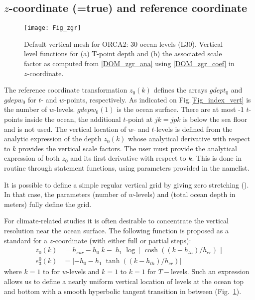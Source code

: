 \documentclass[NEMO_book]{subfiles}
\begin{document}
{%
\subsection[$z$-coordinate (\np{ln\_zco}]
	  	  {$z$-coordinate (=true) and reference coordinate}
\label{DOM_zco}

\begin{figure}[!tb]    \begin{center}
\texttt{[image: Fig\_zgr]}
\caption{ \label{Fig_zgr}    
Default vertical mesh for ORCA2: 30 ocean levels (L30). Vertical level functions for 
(a) T-point depth and (b) the associated scale factor as computed 
from \eqref{DOM_zgr_ana} using \eqref{DOM_zgr_coef} in $z$-coordinate.}
\end{center}   \end{figure}

The reference coordinate transformation $z_0 (k)$ defines the arrays $gdept_0$ 
and $gdepw_0$ for $t$- and $w$-points, respectively. As indicated on 
Fig.\ref{Fig_index_vert}  is the number of $w$-levels. $gdepw_0(1)$ is the 
ocean surface. There are at most -1 $t$-points inside the ocean, the 
additional $t$-point at $jk=jpk$ is below the sea floor and is not used. 
The vertical location of $w$- and $t$-levels is defined from the analytic expression 
of the depth $z_0(k)$ whose analytical derivative with respect to $k$ provides the 
vertical scale factors. The user must provide the analytical expression of both 
$z_0$ and its first derivative with respect to $k$. This is done in routine  
through statement functions, using parameters provided in the  namelist. 

It is possible to define a simple regular vertical grid by giving zero stretching (). 
In that case, the parameters  (number of $w$-levels) and  
(total ocean depth in meters) fully define the grid. 

For climate-related studies it is often desirable to concentrate the vertical resolution 
near the ocean surface. The following function is proposed as a standard for a 
$z$-coordinate (with either full or partial steps): 
\begin{equation} \label{DOM_zgr_ana}
\begin{split}
 z_0 (k) 	&= h_{sur} -h_0 \;k-\;h_1 \;\log \left[ {\,\cosh \left( {{(k-h_{th} )} / {h_{cr} }} \right)\,} \right] \\ 
 e_3^0 (k) 	&= \left| -h_0 -h_1 \;\tanh \left( {{(k-h_{th} )} / {h_{cr} }} \right) \right| 
\end{split}
\end{equation}
where $k=1$ to  for $w$-levels and $k=1$ to $k=1$ for $T-$levels. Such an 
expression allows us to define a nearly uniform vertical location of levels at the 
ocean top and bottom with a smooth hyperbolic tangent transition in between 
(Fig.~\ref{Fig_zgr}).

}
\end{document}
